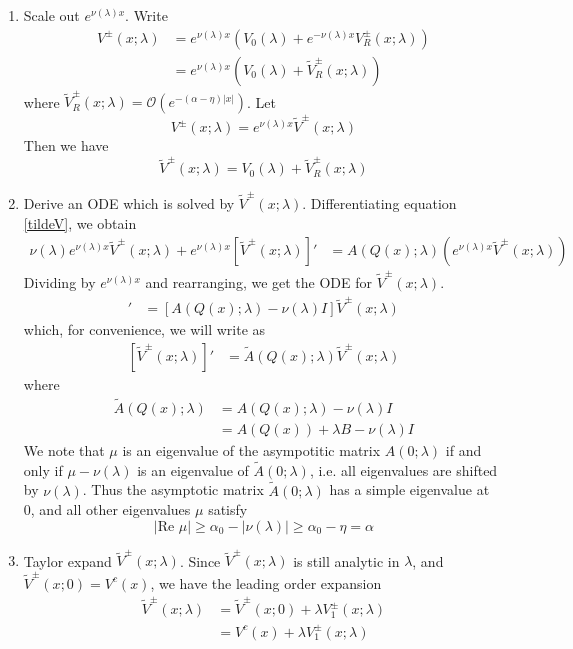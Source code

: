 \documentclass[thesis.tex]{subfiles}
\begin{document}
\begin{enumerate}

\item Scale out $e^{\nu(\lambda)x}$. Write 
\begin{align*}
V^\pm(x; \lambda) &= e^{\nu(\lambda)x} (V_0(\lambda) + e^{-\nu(\lambda)x} V_R^\pm(x; \lambda)) \\
&= e^{\nu(\lambda)x}(V_0(\lambda) + \tilde{V}_R^\pm(x; \lambda))
\end{align*}
where $\tilde{V}_R^\pm(x; \lambda) = \mathcal{O}(e^{-(\alpha - \eta) |x|})$. Let
\begin{equation}\label{tildeV}
V^\pm(x; \lambda) = e^{\nu(\lambda)x}\tilde{V}^\pm(x; \lambda)
\end{equation}
Then we have
\[
\tilde{V}^\pm(x; \lambda) = V_0(\lambda) + \tilde{V}_R^\pm(x; \lambda)
\]

\item Derive an ODE which is solved by $\tilde{V}^\pm(x; \lambda)$. Differentiating equation \eqref{tildeV}, we obtain
\begin{align*}
\nu(\lambda) e^{\nu(\lambda)x}\tilde{V}^\pm(x; \lambda) 
+ e^{\nu(\lambda)x}[\tilde{V}^\pm(x; \lambda)]'
&= A(Q(x); \lambda) (e^{\nu(\lambda)x}\tilde{V}^\pm(x; \lambda))
\end{align*}
Dividing by $e^{\nu(\lambda)x}$ and rearranging, we get the ODE for $\tilde{V}^\pm(x; \lambda)$.
\begin{align*}
[\tilde{V}^\pm(x; \lambda)]'
&= [A(Q(x); \lambda) - \nu(\lambda)I]\tilde{V}^\pm(x; \lambda)
\end{align*}
which, for convenience, we will write as
\begin{align}\label{tildeVeq}
[\tilde{V}^\pm(x; \lambda)]'
&= \tilde{A}(Q(x); \lambda)\tilde{V}^\pm(x; \lambda)
\end{align}
where 
\begin{align*}
\tilde{A}(Q(x); \lambda) &= A(Q(x); \lambda) - \nu(\lambda)I \\
&= A(Q(x)) + \lambda B - \nu(\lambda)I
\end{align*}
We note that $\mu$ is an eigenvalue of the asympotitic matrix $A(0; \lambda)$ if and only if $\mu - \nu(\lambda)$ is an eigenvalue of $\tilde{A}(0; \lambda)$, i.e. all eigenvalues are shifted by $\nu(\lambda)$. Thus the asymptotic matrix $\tilde{A}(0; \lambda)$ has a simple eigenvalue at 0, and all other eigenvalues $\mu$ satisfy
\[
|\text{Re }\mu| \geq \alpha_0 - |\nu(\lambda)| \geq \alpha_0 - \eta = \alpha
\]

\item Taylor expand $\tilde{V}^\pm(x; \lambda)$. Since $\tilde{V}^\pm(x; \lambda)$ is still analytic in $\lambda$, and $\tilde{V}^\pm(x; 0) = V^c(x)$, we have the leading order expansion
\begin{align*}
\tilde{V}^\pm(x; \lambda) &= \tilde{V}^\pm(x; 0) + \lambda V_1^\pm(x; \lambda) \\
&= V^c(x) + \lambda V_1^\pm(x; \lambda)
\end{align*}


\end{enumerate}
\end{document}

